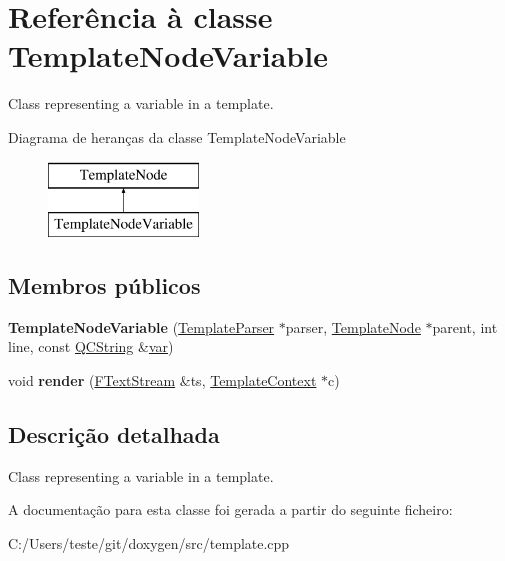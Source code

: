 \hypertarget{class_template_node_variable}{\section{Referência à classe Template\-Node\-Variable}
\label{class_template_node_variable}
}


Class representing a variable in a template.  


Diagrama de heranças da classe Template\-Node\-Variable\begin{figure}[H]
\begin{center}
\leavevmode
\includegraphics[height=2.000000cm]{class_template_node_variable}
\end{center}
\end{figure}
\subsection*{Membros públicos}
\begin{DoxyCompactItemize}
\item 
\hypertarget{class_template_node_variable_a0f1763f79c5c188e1d6136c5e612f245}{{\bfseries Template\-Node\-Variable} (\hyperlink{class_template_parser}{Template\-Parser} $\ast$parser, \hyperlink{class_template_node}{Template\-Node} $\ast$parent, int line, const \hyperlink{class_q_c_string}{Q\-C\-String} \&\hyperlink{018__def_8c_a335628f2e9085305224b4f9cc6e95ed5}{var})}\label{class_template_node_variable_a0f1763f79c5c188e1d6136c5e612f245}

\item 
\hypertarget{class_template_node_variable_aaa6575d8c79eeaa49f849f1ca1d6b228}{void {\bfseries render} (\hyperlink{class_f_text_stream}{F\-Text\-Stream} \&ts, \hyperlink{class_template_context}{Template\-Context} $\ast$c)}\label{class_template_node_variable_aaa6575d8c79eeaa49f849f1ca1d6b228}

\end{DoxyCompactItemize}


\subsection{Descrição detalhada}
Class representing a variable in a template. 

A documentação para esta classe foi gerada a partir do seguinte ficheiro\-:\begin{DoxyCompactItemize}
\item 
C\-:/\-Users/teste/git/doxygen/src/template.\-cpp\end{DoxyCompactItemize}

